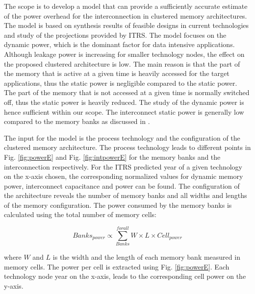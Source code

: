  The scope is to develop a model that can provide a sufficiently accurate estimate of the power overhead for the interconnection in clustered memory architectures.
 The model is based on synthesis results of feasible designs in current technologies and study of the projections provided by ITRS.
 The model focuses on the dynamic power, which is the dominant factor for data intensive applications.
 Although leakage power is increasing for smaller technology nodes, the effect on the proposed clustered architecture is low.
 The main reason is that the part of the memory that is active at a given time is heavily accessed for the target applications, thus the static power is negligible compared to the static power.
 The part of the memory that is not accessed at a given time is normally switched off, thus the static power is heavily reduced. 
 The study of the dynamic power is hence sufficient within our scope.
 The interconnect static power is generally low compared to the memory banks as discussed in \cite{liu1994power}.
 
 The input for the model is the process technology and the configuration of the clustered memory architecture.
 The process technology leads to different points in Fig. \ref{fig:powerE} and Fig. \ref{fig:intpowerE} for the memory banks and the interconnection respectively.
 For the ITRS predicted year of a given technology on the x-axis chosen, the corresponding normalized values for dynamic memory power, interconnect capacitance and power can be found. 
 The configuration of the architecture reveals the number of memory banks and all widths and lengths of the memory configuration.
 The power consumed by the memory banks is calculated using the total number of memory cells:
 \begin{center}
 $$ Banks_{power} \propto \sum_{Banks}^{for all} W \times L \times Cell_{power} $$
 \end{center}
  where $W$ and $L$ is the width and the length of each memory bank measured in memory cells. 
  The power per cell is extracted using Fig. \ref{fig:powerE}.
  Each technology node year on the x-axis, leads to the corresponding cell power on the y-axis.

